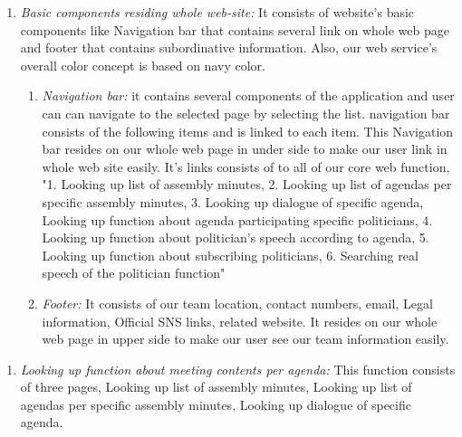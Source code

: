 \documentclass[conference]{IEEEtran}
\begin{document}
\begin{enumerate}
         \begin{enumerate}
    \item \textit{Basic components residing whole web-site:} It consists of website's basic components like Navigation bar that contains several link on whole web page and footer that contains subordinative information. Also, our web service's overall color concept is based on navy color. \\
            \begin{enumerate}
    \item \textit{Navigation bar:} it contains several components of the application and user can can navigate to the selected page by selecting the list. navigation bar consists of the following items and is linked to each item. This Navigation bar resides on our whole web page in under side to make our user link in  whole web site easily. It's links consists of to all of our core web function, "1. Looking up list of assembly minutes, 2. Looking up list of agendas per specific assembly minutes, 3. Looking up dialogue of specific agenda, Looking up function about agenda participating specific politicians, 4. Looking up function about politician's speech according to agenda, 5. Looking up function about subscribing politicians, 6. Searching real speech of the politician function" \\
    
    \item \textit{Footer:} It consists of our team location, contact numbers, email, Legal information, Official SNS links, related website. It resides on our whole web page in upper side to make our user see our team information easily.
    \\
        \end{enumerate}
            \end{enumerate}
    
    \begin{enumerate}
        \item \textit{Looking up function about meeting contents per agenda:} This function consists of three pages, Looking up list of assembly minutes, Looking up list of agendas per specific assembly minutes, Looking up dialogue of specific agenda.
        \\
        
         \begin{enumerate}
         

\end{enumerate}
\end{enumerate}
\end{enumerate}
\end{document}
